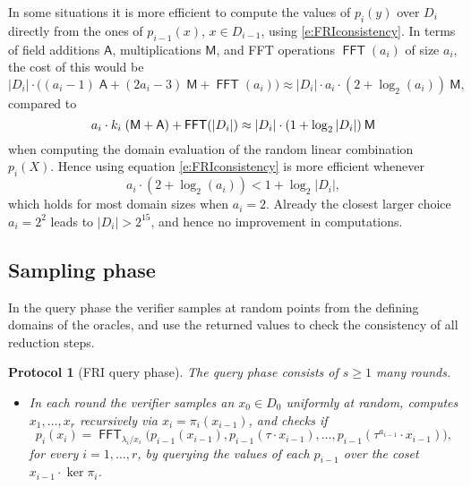\documentclass[11pt]{article}
\newtheorem{protocol}[]{Protocol}
\theoremstyle{definition}
\theoremstyle{remark}
\DeclareMathOperator{\FFT}{\mathsf{FFT}}
\begin{document}
In some situations it is more efficient to compute the values of $p_i(y)$ over $D_i$ directly from the ones of $p_{i-1}(x)$, $x\in D_{i-1}$, using \eqref{e:FRIconsistency}. 
In terms of field additions $\mathsf A$, multiplications $\mathsf M$,  and FFT operations $\FFT(a_i)$ of size $a_i$, 
the cost of this would be
\[
|D_i|\cdot \big((a_i-1) \;\mathsf A + (2 a_i - 3)\;\mathsf{M}  + \FFT(a_i)\big)\approx |D_i|\cdot a_i\cdot (2 + \log_2(a_i))\: \mathsf{M},
\]
compared to 
\[
a_i \cdot k_i \; (\mathsf M + \mathsf A) + 
\FFT(|D_i|) \approx |D_i|\cdot (1 + \log_2 |D_i|) \:\textsf M
\] 
when computing the domain evaluation of the random linear combination $p_i(X)$.
Hence using equation \eqref{e:FRIconsistency} is more efficient whenever
\begin{equation}
a_i\cdot (2 + \log_2(a_i)) < 1 + \log_2 |D_i|,
\end{equation}
which holds for most domain sizes when $a_i=2$. 
Already the closest larger choice $a_i = 2^2$ leads to $|D_i|>2^{15}$, and hence no improvement in computations.
 
\subsection{Sampling phase}

In the query phase the verifier samples at random points from the defining domains of the oracles, and use the returned values to check the consistency of all reduction steps.
\begin{protocol}[FRI query phase]
The query phase consists of $s\geq 1$ many rounds. 
\begin{itemize}
\item
In each round the verifier samples an $x_0 \in D_0$ uniformly at random, computes $x_1, \ldots, x_r$ recursively via  $x_{i}=\pi_{i}(x_{i-1})$, and checks if
\[
p_i(x_i)= \FFT_{\lambda_i / x_i}\big(p_{i-1}(x_{i-1}), p_{i-1}(\tau\cdot x_{i-1}), \ldots, p_{i-1}(\tau^{a_{i-1}}\cdot x_{i-1})\big),
\]
for every $i=1,\ldots,r$, by querying  the values of each $p_{i-1}$  over the coset $x_{i-1}\cdot\ker\pi_i$.
\end{itemize}
\end{protocol}
\end{document}
